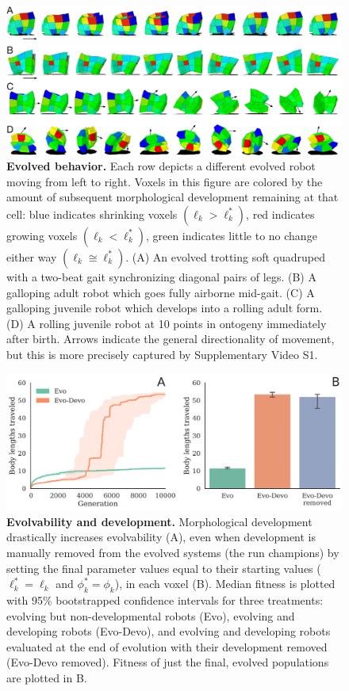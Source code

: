 \begin{figure}
\includegraphics[width=\linewidth]{Fig2}
\caption{\label{fig:trot-gallop-roll}\textbf{Evolved behavior.}
Each row depicts a different evolved robot moving from left to right. 
Voxels in this figure are colored by the amount of subsequent morphological development remaining at that cell: blue indicates shrinking voxels $(\ell_k > \ell_k^*)$, red indicates growing voxels $(\ell_k < \ell_k^*)$, green indicates little to no change either way $(\ell_k \cong \ell_k^*)$.
(A) An evolved trotting soft quadruped with a two-beat gait synchronizing diagonal pairs of legs. 
(B) A galloping adult robot which goes fully airborne mid-gait.
(C) A galloping juvenile robot which develops into a rolling adult form. 
(D) A rolling juvenile robot at 10 points in ontogeny immediately after birth.
Arrows indicate the general directionality of movement,  
but this is more precisely captured by
Supplementary Video S1. 
}
\end{figure}

\begin{figure}
\centering
\includegraphics[width=0.9\linewidth]{Fig3}
\caption{\label{fig-fitness}\textbf{Evolvability and development.} Morphological development drastically increases evolvability (A), even when development is manually removed from the evolved systems (the run champions) by setting the final parameter values equal to their starting values ($\ell_k^*=\ell_k$ and $\phi_k^*=\phi_k$), in each voxel (B).
Median fitness is plotted with 95\% bootstrapped confidence intervals for three treatments: evolving but non-developmental robots (Evo), evolving and developing robots (Evo-Devo), and evolving and developing robots evaluated at the end of evolution with their development removed (Evo-Devo removed).
Fitness of just the final, evolved populations are plotted in B.}
\end{figure}

